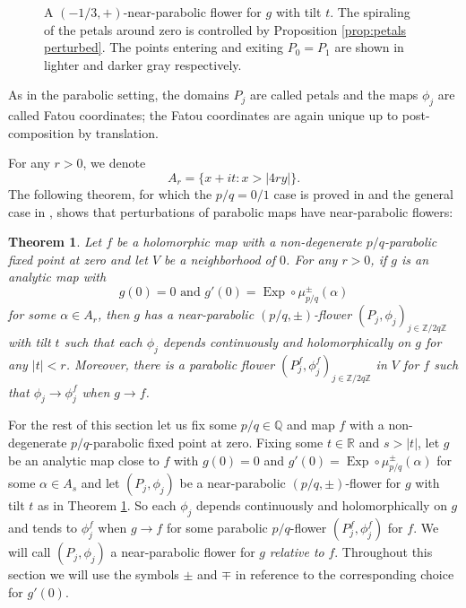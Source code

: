 \documentclass[12pt,letterpaper]{amsart}
\numberwithin{equation}{section}
\newtheorem{theorem}[equation]{Theorem}
\theoremstyle{remark}
\theoremstyle{definition}
\newcommand{\Q}{\mathbb Q}
\newcommand{\R}{\mathbb R}
\newcommand{\Z}{\mathbb Z}
\DeclareMathOperator{\Exp}{Exp}
\begin{document}
\begin{figure}
	\begin{center}
		\def\svgwidth{6in}
		
		\caption{A $(-1/3, +)$-near-parabolic flower for $g$ with tilt $t$. The spiraling of the petals around zero is controlled by Proposition \ref{prop:petals perturbed}. The points entering and exiting $P_0=P_1$ are shown in lighter and darker gray respectively.}
		\label{parabolic perturned fig}
	\end{center}
\end{figure}

As in the parabolic setting, the domains $P_j$ are called petals and the maps $\phi_j$ are called Fatou coordinates; the Fatou coordinates are again unique up to post-composition by translation. 


For any $r>0$, we denote $$A_r= \{x+it:  x>|4ry|\}.$$
The following theorem, for which the $p/q=0/1$ case is proved in \cite{shishikura_1} and the general case in \cite{shishikura_boundary}, shows that perturbations
of parabolic maps have near-parabolic flowers:


\begin{theorem}\label{thm:near-parabolic flowers}
	Let $f$ be a holomorphic map with a non-degenerate $p/q$-parabolic fixed point at zero and  let $V$ be a neighborhood of $0$.
	For any $r>0$,
 	if $g$ is an analytic map with 
	$$g(0) = 0 \text{ and }g'(0) = \Exp\circ \mu_{p/q}^\pm(\alpha)$$
	for some $\alpha\in A_r$, then $g$ has a near-parabolic $(p/q, \pm)$-flower $(P_j, \phi_j)_{j\in \Z/2q\Z}$ with tilt $t$ such that 
	each $\phi_j$ depends continuously and holomorphically on $g$ for any $|t|< r$. Moreover, there is a parabolic flower $(P^f_j, \phi^f_j)_{j\in \Z/2q\Z}$ in $V$ for $f$   such that $\phi_j\to \phi_j^f$ when $g\to f$.
\end{theorem}


For the rest of this section let us fix some $p/q\in \Q$ and map $f$ with a  non-degenerate $p/q$-parabolic fixed point at zero.
Fixing some $t\in \R$ and $s>|t|$, let 
$g$ be an analytic map close to $f$ with $g(0) = 0$ and $g'(0) = \Exp\circ \mu_{p/q}^\pm(\alpha)$ for some $\alpha\in A_s$ and let 
$(P_j, \phi_j)$ be a near-parabolic $(p/q, \pm)$-flower for $g$ with tilt $t$ as in Theorem 
\ref{thm:near-parabolic flowers}. So each $\phi_j$ depends continuously and holomorphically on $g$ and tends to $\phi_j^f$ when $g\to f$ for some parabolic $p/q$-flower $(P_j^f, \phi_j^f)$ for $f$.
We will call $(P_j, \phi_j)$ a near-parabolic flower for $g$ \textit{relative to} $f$.
Throughout this section we will use the symbols $\pm$ and $\mp$ in reference to the corresponding choice for $g'(0)$.
\end{document}
